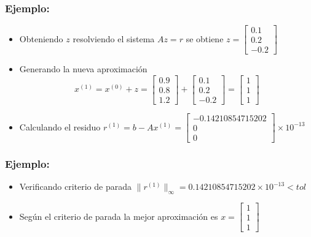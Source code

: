 \documentclass[10pt]{beamer}
\begin{document}
  \begin{frame}
    \frametitle{Ejemplo:}
    \begin{itemize}
      \item Obteniendo $z$ resolviendo el sistema $Az = r$ se obtiene $z =\left[\begin{array}{c}
        0.1\\
        0.2\\
        -0.2
      \end{array}\right]$
      \item<2->Generando la nueva aproximaci\'on
      $$
      x^{(1)} = x^{(0)} + z = \left[\begin{array}{c}
        0.9\\
        0.8\\
        1.2
      \end{array}\right] + \left[\begin{array}{c}
        0.1\\
        0.2\\
        -0.2
      \end{array}\right] = \left[\begin{array}{c}
        1\\
        1\\
        1
      \end{array}\right]
      $$
      \item<3-> Calculando el residuo $r^{(1)} = b - Ax^{(1)} = \left[\begin{array}{c}
        -0.14210854715202\\
        0\\
        0
      \end{array}\right]\times 10^{-13}$
    \end{itemize}
  \end{frame}
  \begin{frame}
    \frametitle{Ejemplo:}
    \begin{itemize}
      \item Verificando criterio de parada $\|r^{(1)}\|_{\infty} = 0.14210854715202\times 10^{-13} < tol$
      \item<2->Seg\'un el criterio de parada la mejor aproximaci\'on es $x=\left[\begin{array}{c}
        1\\
        1\\
        1
      \end{array}\right]$
    \end{itemize}
  \end{frame}
\end{document}
